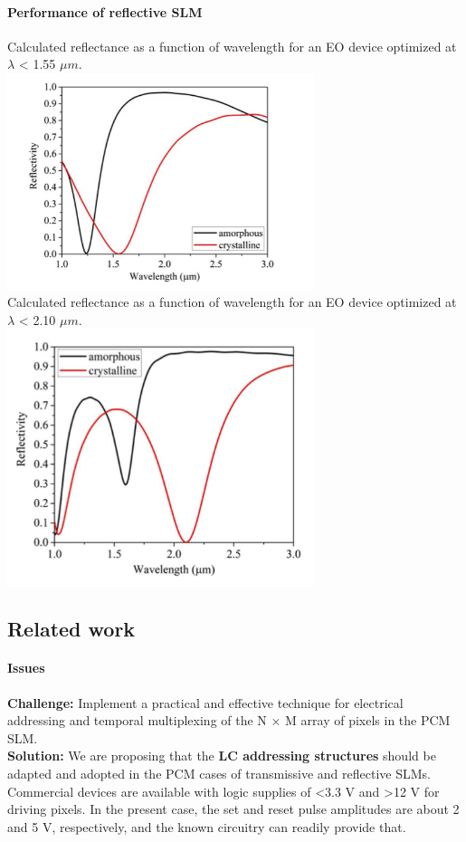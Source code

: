 \documentclass[]{article}
\let\oldparagraph\paragraph
\renewcommand{\paragraph}[1]{\oldparagraph{#1}\mbox{}}
\begin{document}
\paragraph{Performance of reflective
SLM}\label{performance-of-reflective-slm}

Calculated reflectance as a function of wavelength for an EO device
optimized at $\lambda$ < 1.55 $\mu m$.\\
\includegraphics[width = 9cm]{image/002_10.png}\\
Calculated reflectance as a function of wavelength for an EO device
optimized at $\lambda$ < 2.10 $\mu m$.\\
\includegraphics[width = 9cm]{image/002_11.png}

\subsection{Related work}\label{related-work}

\paragraph{Issues}\label{issues}

\textbf{Challenge:} Implement a practical and effective technique for
electrical addressing and temporal multiplexing of the N × M array of
pixels in the PCM SLM.\\
\textbf{Solution:} We are proposing that the \textbf{LC addressing
structures} should be adapted and adopted in the PCM cases of
transmissive and reflective SLMs. Commercial devices are available with
logic supplies of \textless{}3.3 V and \textgreater{}12 V for driving
pixels. In the present case, the set and reset pulse amplitudes are
about 2 and 5 V, respectively, and the known circuitry can readily
provide that.
\end{document}
